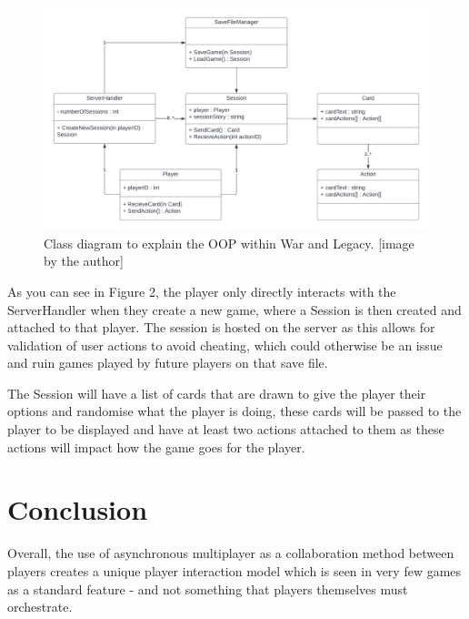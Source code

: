 \documentclass{article}
\begin{document}
\begin{figure}[!h]
    \centering
    \includegraphics[width=12cm]{class-diagram.png}
    \caption{Class diagram to explain the OOP within War and Legacy. [image by the author]}
\end{figure}

As you can see in Figure 2, the player only directly interacts with the ServerHandler when they create a new game, where a Session is then created and attached to that player. The session is hosted on the server as this allows for validation of user actions to avoid cheating, which could otherwise be an issue and ruin games played by future players on that save file.

The Session will have a list of cards that are drawn to give the player their options and randomise what the player is doing, these cards will be passed to the player to be displayed and have at least two actions attached to them as these actions will impact how the game goes for the player.

\section{Conclusion}
Overall, the use of asynchronous multiplayer as a collaboration method between players creates a unique player interaction model which is seen in very few games as a standard feature - and not something that players themselves must orchestrate.


\printbibliography[filter=papers]
\printbibliography[type=software, title={Games}]

\listoffigures
\end{document}
